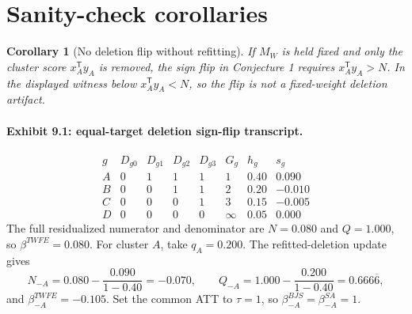 \documentclass[11pt]{article}
\newcommand{\transpose}{\mathsf{T}}
\theoremstyle{definition}
\theoremstyle{plain}
\newtheorem{corollary}{Corollary}
\theoremstyle{remark}
\begin{document}
\section{Sanity-check corollaries}
\begin{corollary}[No deletion flip without refitting]\label{cor:no-refit}
If \(M_W\) is held fixed and only the cluster score \(x_A^\transpose y_A\) is removed, the sign flip in Conjecture 1 requires \(x_A^\transpose y_A>N\).  In the displayed witness below \(x_A^\transpose y_A<N\), so the flip is not a fixed-weight deletion artifact.
\end{corollary}

\paragraph{Exhibit 9.1: equal-target deletion sign-flip transcript.}
\[
\begin{array}{c|cccc|c|c|c}
g & D_{g0}&D_{g1}&D_{g2}&D_{g3}& G_g & h_g & s_g\\ \hline
A&0&1&1&1&1&0.40&0.090\\
B&0&0&1&1&2&0.20&-0.010\\
C&0&0&0&1&3&0.15&-0.005\\
D&0&0&0&0&\infty&0.05&0.000
\end{array}
\]
The full residualized numerator and denominator are \(N=0.080\) and \(Q=1.000\), so \(\beta^{TWFE}=0.080\).  For cluster \(A\), take \(q_A=0.200\).  The refitted-deletion update gives
\[
N_{-A}=0.080-\frac{0.090}{1-0.40}=-0.070,\qquad
Q_{-A}=1.000-\frac{0.200}{1-0.40}=0.666\overline{6},
\]
and \(\beta^{TWFE}_{-A}=-0.105\).  Set the common ATT to \(\tau=1\), so \(\beta^{BJS}_{-A}=\beta^{SA}_{-A}=1\).
\end{document}
